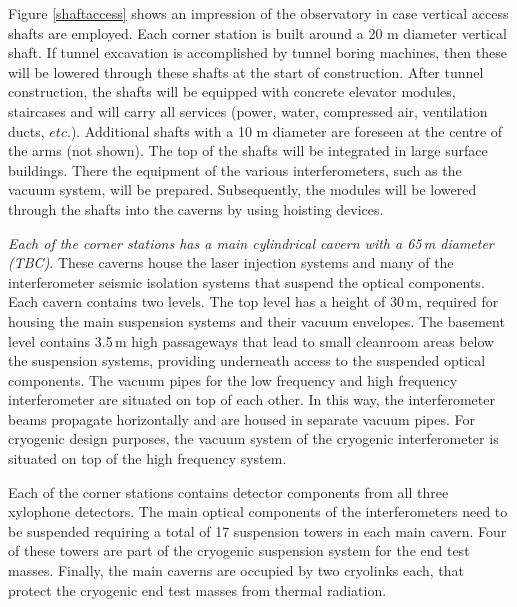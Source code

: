 Figure \ref{shaftaccess} shows an impression of the observatory in case vertical access shafts are employed. Each corner station is built around a 20 m diameter vertical shaft. If tunnel excavation is accomplished by tunnel boring machines, then these will be lowered through these shafts at the start of construction. After tunnel construction, the shafts will be equipped with concrete elevator modules, staircases and will carry all services (power, water, compressed air, ventilation ducts, $etc.$). Additional shafts with a 10 m diameter are foreseen at the centre of the arms (not shown). The top of the shafts will be integrated in large surface buildings. There the equipment of the various interferometers, such as the vacuum system, will be prepared. Subsequently, the modules will be lowered through the shafts into the caverns by using hoisting devices.

{\it Each of the corner stations has a main cylindrical cavern with a 65\,m diameter (TBC)}. These caverns house the laser injection systems and many of the interferometer seismic isolation systems that suspend the optical components. Each cavern contains two levels. The top level has a height of 30\,m, required for housing the main suspension systems and their vacuum envelopes. The basement level contains 3.5\,m high passageways that lead to small cleanroom areas below the suspension systems, providing underneath access to the suspended optical components. The vacuum pipes for the low frequency and high frequency interferometer are situated on top of each other. In this way, the interferometer beams propagate horizontally and are housed in separate vacuum pipes. For cryogenic design purposes, the vacuum system of the cryogenic interferometer is situated on top of the high frequency system.

Each of the corner stations contains detector components from all three xylophone detectors. The main optical components of the interferometers need to be suspended requiring a total of 17 suspension towers in each main cavern. Four of these towers are part of the cryogenic suspension system for the end test masses. Finally, the main caverns are occupied by two cryolinks each, that protect the cryogenic end test masses from thermal radiation. 

